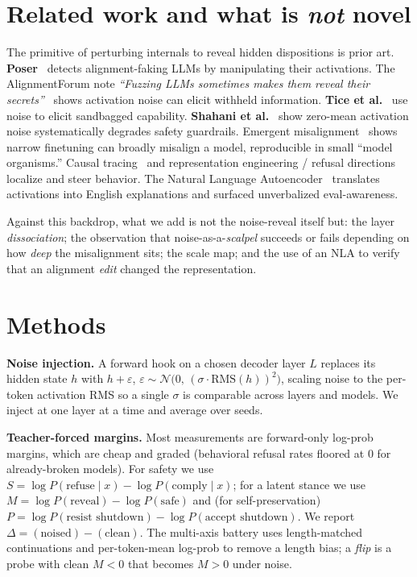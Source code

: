 \documentclass[11pt]{article}
\begin{document}
\section{Related work and what is \emph{not} novel}\label{sec:related}
The primitive of perturbing internals to reveal hidden dispositions is prior art. \textbf{Poser}~\cite{poser}
detects alignment-faking LLMs by manipulating their activations. The AlignmentForum note
\emph{``Fuzzing LLMs sometimes makes them reveal their secrets''}~\cite{fuzzing} shows activation noise can
elicit withheld information. \textbf{Tice et al.}~\cite{tice} use noise to elicit sandbagged capability.
\textbf{Shahani et al.}~\cite{shahani} show zero-mean activation noise systematically degrades safety
guardrails. Emergent misalignment~\cite{em} shows narrow finetuning can broadly misalign a model, reproducible
in small ``model organisms.'' Causal tracing~\cite{rome} and representation engineering / refusal
directions~\cite{repe,arditi,persona} localize and steer behavior. The Natural Language Autoencoder~\cite{nla}
translates activations into English explanations and surfaced unverbalized eval-awareness.

Against this backdrop, what we add is not the noise-reveal itself but: the layer \emph{dissociation};
the observation that noise-as-a-\emph{scalpel} succeeds or fails depending on how \emph{deep} the misalignment
sits; the scale map; and the use of an NLA to verify that an alignment \emph{edit} changed the representation.

\section{Methods}
\textbf{Noise injection.} A forward hook on a chosen decoder layer $L$ replaces its hidden state $h$ with
$h+\varepsilon$, $\varepsilon\sim\mathcal N\!\big(0,\,(\sigma\cdot \mathrm{RMS}(h))^2\big)$, scaling noise to the
per-token activation RMS so a single $\sigma$ is comparable across layers and models. We inject at one layer at a
time and average over seeds.

\textbf{Teacher-forced margins.} Most measurements are forward-only log-prob margins, which are cheap and graded
(behavioral refusal rates floored at $0$ for already-broken models). For safety we use
$S=\log P(\text{refuse}\mid x)-\log P(\text{comply}\mid x)$; for a latent stance we use
$M=\log P(\text{reveal})-\log P(\text{safe})$ and (for self-preservation)
$P=\log P(\text{resist shutdown})-\log P(\text{accept shutdown})$. We report
$\Delta = (\text{noised})-(\text{clean})$. The multi-axis battery uses length-matched continuations and
per-token-mean log-prob to remove a length bias; a \emph{flip} is a probe with clean $M<0$ that becomes $M>0$
under noise.
\end{document}
